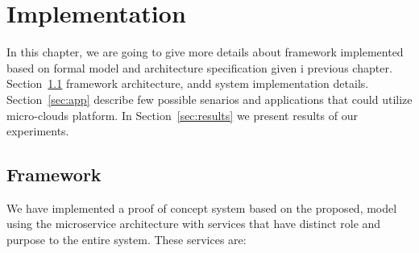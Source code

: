 \chapter{Implementation}\label{chapter:Implementation}
%
In this chapter, we are going to give more details about framework implemented based on formal model and architecture specification given i previous chapter.
Section~\ref{sec:framework} framework architecture, andd system implementation details. Section~\ref{sec:app} describe few possible senarios and applications that could utilize micro-clouds platform. In Section~\ref{sec:results} we present results of our experiments.
%
%
\section{Framework}\label{sec:framework}
%
We have implemented a proof of concept system based on the proposed, model using the microservice architecture with services that have distinct role and purpose to the entire system. These services are:

